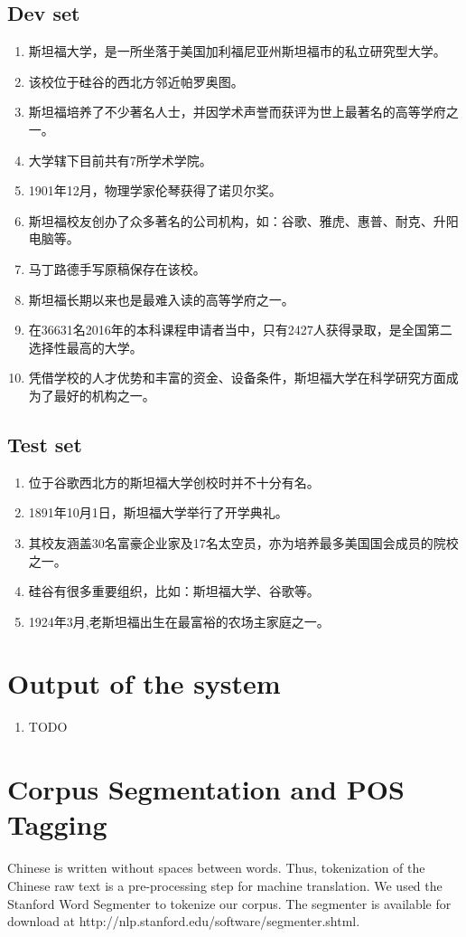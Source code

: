 \documentclass[11pt]{article} %
\begin{document}
\begin{CJK}{UTF8}{gbsn}
\subsection{Dev set}
\begin{enumerate}
\item 斯坦福大学，是一所坐落于美国加利福尼亚州斯坦福市的私立研究型大学。
\item 该校位于硅谷的西北方邻近帕罗奥图。
\item 斯坦福培养了不少著名人士，并因学术声誉而获评为世上最著名的高等学府之一。
\item 大学辖下目前共有7所学术学院。
\item 1901年12月，物理学家伦琴获得了诺贝尔奖。
\item 斯坦福校友创办了众多著名的公司机构，如：谷歌、雅虎、惠普、耐克、升阳电脑等。
\item 马丁路德手写原稿保存在该校。
\item 斯坦福长期以来也是最难入读的高等学府之一。
\item 在36631名2016年的本科课程申请者当中，只有2427人获得录取，是全国第二选择性最高的大学。
\item 凭借学校的人才优势和丰富的资金、设备条件，斯坦福大学在科学研究方面成为了最好的机构之一。
\end{enumerate}
\subsection{Test set}
\begin{enumerate}
\item 位于谷歌西北方的斯坦福大学创校时并不十分有名。
\item 1891年10月1日，斯坦福大学举行了开学典礼。
\item 其校友涵盖30名富豪企业家及17名太空员，亦为培养最多美国国会成员的院校之一。
\item 硅谷有很多重要组织，比如：斯坦福大学、谷歌等。
\item 1924年3月,老斯坦福出生在最富裕的农场主家庭之一。
\end{enumerate}

\section{Output of the system}
\begin{enumerate}
\item TODO
\end{enumerate}

\section{Corpus Segmentation and POS Tagging}
Chinese is written without spaces between words. Thus, tokenization of the Chinese raw text is a pre-processing step for machine translation. We used the Stanford Word Segmenter to tokenize our corpus. The segmenter is available for download at http://nlp.stanford.edu/software/segmenter.shtml.


\end{CJK}
\end{document}
